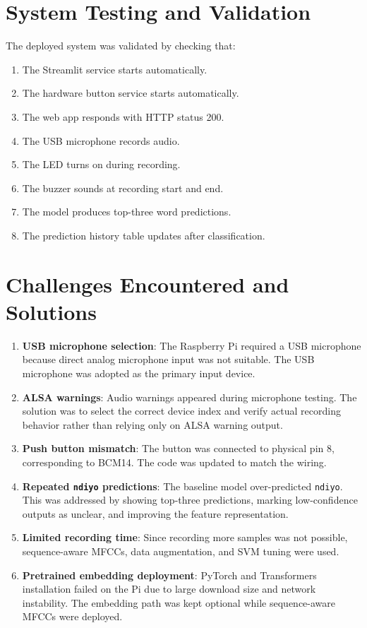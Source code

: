 \documentclass[12pt,a4paper]{report}
\begin{document}
\section{System Testing and Validation}
The deployed system was validated by checking that:
\begin{enumerate}
    \item The Streamlit service starts automatically.
    \item The hardware button service starts automatically.
    \item The web app responds with HTTP status 200.
    \item The USB microphone records audio.
    \item The LED turns on during recording.
    \item The buzzer sounds at recording start and end.
    \item The model produces top-three word predictions.
    \item The prediction history table updates after classification.
\end{enumerate}

\section{Challenges Encountered and Solutions}
\begin{enumerate}[label=\alph*)]
    \item \textbf{USB microphone selection}: The Raspberry Pi required a USB microphone because direct analog microphone input was not suitable. The USB microphone was adopted as the primary input device.
    \item \textbf{ALSA warnings}: Audio warnings appeared during microphone testing. The solution was to select the correct device index and verify actual recording behavior rather than relying only on ALSA warning output.
    \item \textbf{Push button mismatch}: The button was connected to physical pin 8, corresponding to BCM14. The code was updated to match the wiring.
    \item \textbf{Repeated \texttt{ndiyo} predictions}: The baseline model over-predicted \texttt{ndiyo}. This was addressed by showing top-three predictions, marking low-confidence outputs as unclear, and improving the feature representation.
    \item \textbf{Limited recording time}: Since recording more samples was not possible, sequence-aware MFCCs, data augmentation, and SVM tuning were used.
    \item \textbf{Pretrained embedding deployment}: PyTorch and Transformers installation failed on the Pi due to large download size and network instability. The embedding path was kept optional while sequence-aware MFCCs were deployed.
\end{enumerate}
\end{document}
